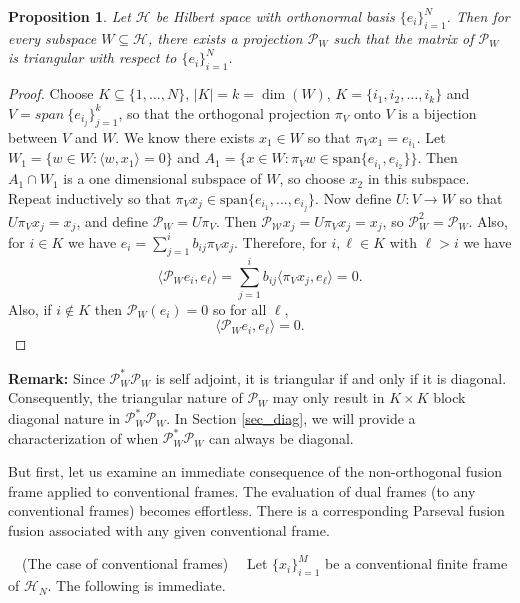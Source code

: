 \documentclass[11pt,reqno]{amsart}
\newtheorem{proposition}[thm]{Proposition}
\theoremstyle{remark}
\begin{document}
\begin{proposition}
Let $\mathcal{H}$ be Hilbert space with orthonormal basis $\{e_i\}_{i=1}^N$.  Then for every subspace $W\subseteq\mathcal{H}$, there exists a projection $\mathcal{P}_W$ such that the matrix of $\mathcal{P}_W$ is triangular with respect to $\{e_i\}_{i=1}^N$.
\end{proposition}
\begin{proof}
Choose $K\subseteq\{1,...,N\}$, $|K|=k=\dim(W)$,
$K = \{i_1,i_2,\ldots,i_k\}$  and $V = span\ \{e_{i_j}\}_{j=1}^k$,
so that the orthogonal projection $\pi_V$ onto $V$ is a
bijection between $V$ and $W$.  We know there exists $x_1\in W$ so that $\pi_Vx_1=e_{i_1}$.  Let $W_1=\{w\in W:\langle w,x_1\rangle=0\}$ and $A_1=\{x\in W:\pi_Vw\in\text{span}\{e_{i_1},e_{i_2}\}\}$.  Then $A_1\cap W_1$ is a one dimensional subspace of $W$, so choose $x_2$ in this subspace.  Repeat inductively so that $\pi_Vx_j\in\text{span}\{e_{i_1},...,e_{i_j}\}$.  Now define $U:V\rightarrow W$ so that $U\pi_Vx_j=x_j$, and define $\mathcal{P}_W=U\pi_V$.  Then $\mathcal{P_W}x_j=U\pi_Vx_j=x_j$, so $\mathcal{P}_W^2=\mathcal{P}_W$.  Also, for $i\in K$ we have $e_i=\sum_{j=1}^ib_{ij}\pi_Vx_j$.  Therefore, for $i,\ell \in K$ with $\ell>i$ we have
$$
\langle\mathcal{P}_We_i,e_{\ell}\rangle=\sum_{j=1}^ib_{ij}\langle\pi_Vx_j,e_{\ell}\rangle=0.
$$
Also, if $i\notin K$ then $\mathcal{P}_W(e_i) = 0$ so for all $\ell$,
$$
\langle\mathcal{P}_We_i,e_{\ell}\rangle=0.
$$
\end{proof}

\noindent\textbf{Remark: }Since ${\mathcal P}_W^*{\mathcal P}_W$ is self adjoint, it is triangular if and only if it is diagonal.   Consequently, the triangular nature of ${{\mathcal P}}_W$ may only result in $K\times K$ block diagonal nature in ${{\mathcal P}}_W^*{{\mathcal P}}_W$.  In Section \ref{sec_diag}, we will provide a characterization of when ${{\mathcal P}}_W^*{{\mathcal P}}_W$ can always be diagonal.

But first, let us examine an immediate consequence of the non-orthogonal fusion frame applied to conventional frames.   The evaluation of dual frames (to any conventional frames) becomes effortless.  There is a corresponding Parseval fusion fusion associated with any given conventional frame.
\smallskip
\smallskip

\ \  (The case of conventional frames) \ \
Let $\{x_i\}_{i=1}^{M}$ be a conventional finite frame of ${\mathcal H}_N$.  The following is immediate.
\end{document}
